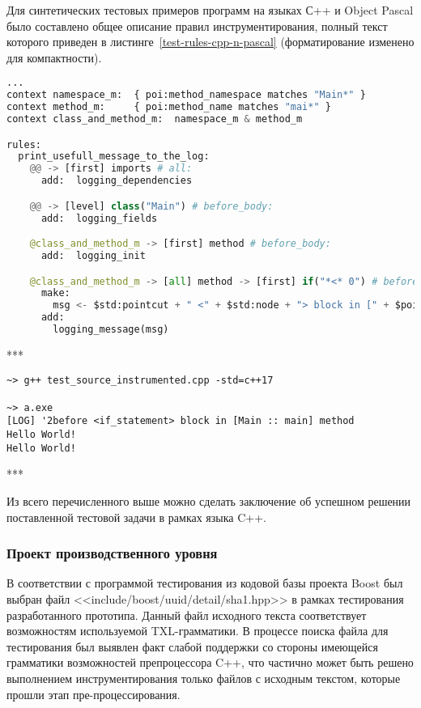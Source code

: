 Для синтетических тестовых примеров программ на языках С++ и Object Pascal было составлено общее описание правил инструментирования, полный текст которого приведен в листинге~\ref{test-rules-cpp-n-pascal} (форматирование изменено для компактности).

\begin{lstlisting}[frame=single, language=Python, label={test-rules-cpp-n-pascal}, caption={Описание правил инструментирования.}]
...
context namespace_m:  { poi:method_namespace matches "Main*" }
context method_m:     { poi:method_name matches "mai*" }
context class_and_method_m:  namespace_m & method_m

rules:
  print_usefull_message_to_the_log:
    @@ -> [first] imports # all:
      add:  logging_dependencies

    @@ -> [level] class("Main") # before_body:
      add:  logging_fields

    @class_and_method_m -> [first] method # before_body:
      add:  logging_init

    @class_and_method_m -> [all] method -> [first] if("*<* 0") # before:
      make:
        msg <- $std:pointcut + " <" + $std:node + "> block in [" + $poi:method_name_full + "] method";
      add:
        logging_message(msg)
\end{lstlisting}

***

\begin{lstlisting}[frame=single, label={test-cpp-run}, caption={Результаты запуска обработанного тестового приложения.}]
~> g++ test_source_instrumented.cpp -std=c++17

~> a.exe
[LOG] '2before <if_statement> block in [Main :: main] method
Hello World!
Hello World!
\end{lstlisting}

***

Из всего перечисленного выше можно сделать заключение об успешном решении поставленной тестовой задачи в рамках языка C++.

\subsubsection{Проект производственного уровня}

В соответствии с программой тестирования из кодовой базы проекта Boost был выбран файл <<include/boost/uuid/detail/sha1.hpp>> в рамках тестирования разработанного прототипа.
Данный файл исходного текста соответствует возможностям используемой TXL-грамматики.
В процессе поиска файла для тестирования был выявлен факт слабой поддержки со стороны имеющейся грамматики возможностей препроцессора C++, что частично может быть решено выполнением инструментирования только файлов с исходным текстом, которые прошли этап пре-процессирования.

